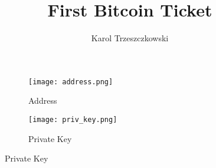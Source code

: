 \documentclass[a4,11pt]{article}
\author{Karol Trzeszczkowski}
\title{First Bitcoin Ticket}
\begin{document}
\maketitle
\begin{figure}[h!]
\centering
\begin{subfigure}[h]{0.4\textwidth}
\texttt{[image: address.png]}
\caption{Address}
\end{subfigure}
\begin{subfigure}[h]{0.4\textwidth}
\texttt{[image: priv\_key.png]}
\caption{Private Key}
\end{subfigure}
\end{figure}
\end{document}

